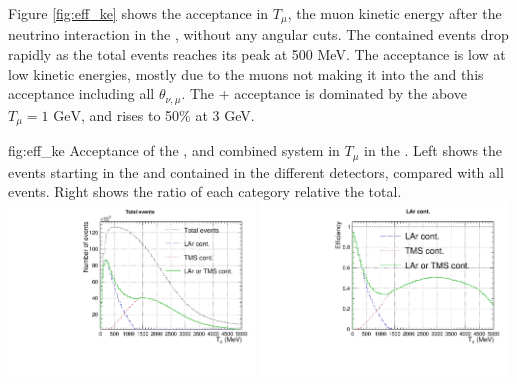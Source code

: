 Figure \ref{fig:eff_ke} shows the acceptance in $T_\mu$, the muon kinetic energy after the neutrino interaction in the , without any angular cuts.   The  contained events drop rapidly as the total events reaches its peak at 500 MeV. The  acceptance is low at low kinetic energies, mostly due to the muons not making it into the  and this acceptance including all $\theta_{\nu,\mu}$. The + acceptance is dominated by the  above $T_\mu=1\text{ GeV}$, and rises to 50\% at 3 GeV. 
\begin{dunefigure}{fig:eff_ke}
{Acceptance of the ,  and combined system in $T_\mu$ in the . Left shows the events starting in the  and contained in the different detectors, compared with all events. Right shows the ratio of each category relative the total.}
\includegraphics[width=0.49\textwidth, clip, trim={0mm 0mm 0mm 10mm}]{graphics/tms/Simulation/Efficiency/eff_muke.pdf} \includegraphics[width=0.49\textwidth, clip, trim={0mm 0mm 0mm 10mm}]{graphics/tms/Simulation/Efficiency/eff_muke_ratio.pdf}
\end{dunefigure}


